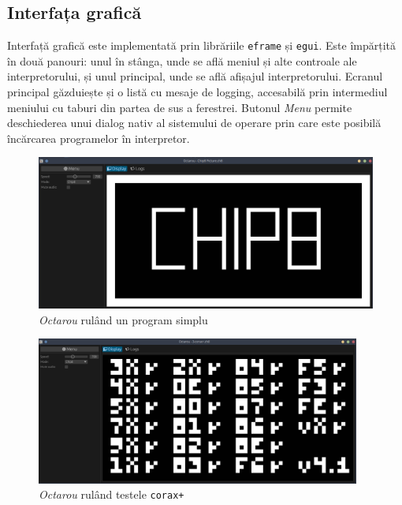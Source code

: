 \documentclass[a4paper]{article}
\begin{document}
\subsection{Interfața grafică}
Interfață grafică este implementată prin librăriile \texttt{eframe} și \texttt{egui}. Este împărțită în două panouri: unul în stânga, unde se află
meniul și alte controale ale interpretorului, și unul principal, unde se află afișajul interpretorului. Ecranul principal găzduiește și o listă cu
mesaje de logging, accesabilă prin intermediul meniului cu taburi din partea de sus a ferestrei. Butonul \textit{Menu} permite deschiederea unui
dialog nativ al sistemului de operare prin care este posibilă încărcarea programelor în interpretor.

\begin{figure}
	\begin{center}
		\includegraphics[width=\textwidth]{figures/chip8-logo.png}
	\end{center}
	\caption{\textit{Octarou} rulând un program simplu}
\end{figure}

\begin{figure}[p!]
	\begin{center}
		\includegraphics[width=0.95\textwidth]{figures/corax.png}
	\end{center}
	\caption{\textit{Octarou} rulând testele \texttt{corax+}}
\end{figure}
\end{document}
